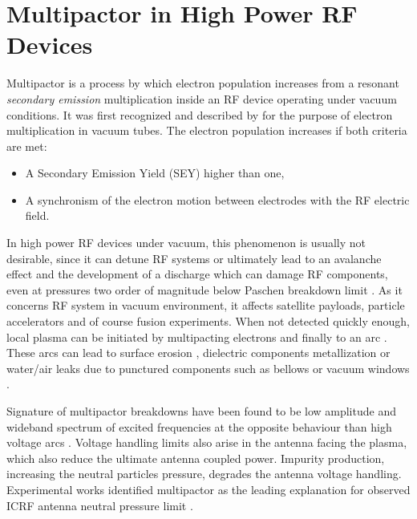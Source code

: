 \section[Multipactor]{Multipactor in High Power RF Devices}
Multipactor is a process by which electron population increases from a resonant \textit{secondary emission} multiplication inside an RF device operating under vacuum conditions. It was first recognized and described by  for the purpose of electron multiplication in vacuum tubes. The electron population increases if both criteria are met: 
\begin{itemize}
	\item A Secondary Emission Yield (SEY) higher than one,
	\item A synchronism of the electron motion between electrodes with the RF electric field.
\end{itemize}

In high power RF devices under vacuum, this phenomenon is usually not desirable, since it can detune RF systems or ultimately lead to an avalanche effect and the development of a discharge which can damage RF components, even at pressures two order of magnitude below Paschen breakdown limit . As it concerns RF system in vacuum environment, it affects satellite payloads, particle accelerators  and of course fusion experiments. When not detected quickly enough, local plasma can be initiated by multipacting electrons and finally to an arc . These arcs can lead to surface erosion , dielectric components metallization  or water/air leaks due to punctured components such as bellows or vacuum windows . 


Signature of multipactor breakdowns have been found to be low amplitude and wideband spectrum of excited frequencies at the opposite behaviour than high voltage arcs \cite{dinca2009}. Voltage handling limits also arise in the antenna facing the plasma, which also reduce the ultimate antenna coupled power. Impurity production, increasing the neutral particles pressure, degrades the antenna voltage handling. Experimental works identified multipactor as the leading explanation for observed ICRF antenna neutral pressure limit .

